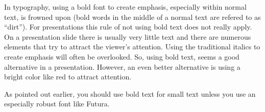 In typography, using a bold font to create emphasis, especially within
normal text, is frowned upon (bold words in the middle of a normal
text are refered to as ``dirt''). For presentations this rule of not
using bold text does not really apply. On a presentation slide there
is usually very little text and there are numerous elements that try
to attract the viewer's attention. Using the traditional italics to
create emphasis will often be overlooked. So, using bold text, seems a
good alternative in a presentation. However, an even better
alternative is using a bright color like red to attract attention.

As pointed out earlier, you should use bold text for small text
unless you use an especially robust font like Futura.



